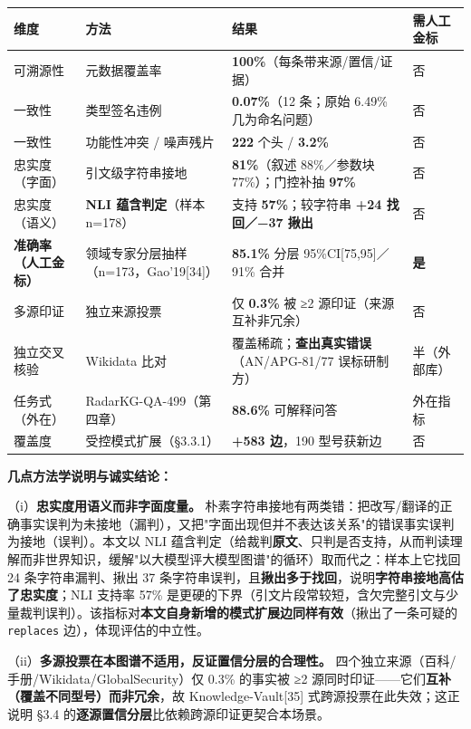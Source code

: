 \documentclass[12pt,a4paper]{ctexart}
\begin{document}
\begin{center}\small
\begin{tabular}{|p{}|p{}|p{}|p{}|}
\hline
\textbf{维度} & \textbf{方法} & \textbf{结果} & \textbf{需人工金标} \\ \hline
可溯源性 & 元数据覆盖率 & \textbf{100\%}（每条带来源/置信/证据） & 否 \\ \hline
一致性 & 类型签名违例 & \textbf{0.07\%}（12 条；原始 6.49\% 几为命名问题） & 否 \\ \hline
一致性 & 功能性冲突 / 噪声残片 & \textbf{222} 个头 / \textbf{3.2\%} & 否 \\ \hline
忠实度（字面） & 引文级字符串接地 & \textbf{81\%}（叙述 88\%／参数块 77\%）；门控补抽 \textbf{97\%} & 否 \\ \hline
忠实度（语义） & \textbf{NLI 蕴含判定}（样本 n=178） & 支持 \textbf{57\%}；较字符串 \textbf{+24 找回／−37 揪出} & 否 \\ \hline
\textbf{准确率（人工金标）} & 领域专家分层抽样（n=173，Gao'19[34]） & \textbf{85.1\%} 分层 95\%CI[75,95]／91\% 合并 & \textbf{是} \\ \hline
多源印证 & 独立来源投票 & 仅 \textbf{0.3\%} 被 ≥2 源印证（来源互补非冗余） & 否 \\ \hline
独立交叉核验 & Wikidata 比对 & 覆盖稀疏；\textbf{查出真实错误}（AN/APG-81/77 误标研制方） & 半（外部库） \\ \hline
任务式（外在） & RadarKG-QA-499（第四章） & \textbf{88.6\%} 可解释问答 & 外在指标 \\ \hline
覆盖度 & 受控模式扩展（§3.3.1） & \textbf{+583 边}，190 型号获新边 & 否 \\ \hline
\end{tabular}
\end{center}

\textbf{几点方法学说明与诚实结论：}

（i）\textbf{忠实度用语义而非字面度量。} 朴素字符串接地有两类错：把改写/翻译的正确事实误判为未接地（漏判），又把"字面出现但并不表达该关系"的错误事实误判为接地（误判）。本文以 NLI 蕴含判定（给裁判\textbf{原文}、只判是否支持，从而判读理解而非世界知识，缓解"以大模型评大模型图谱"的循环）取而代之：样本上它找回 24 条字符串漏判、揪出 37 条字符串误判，且\textbf{揪出多于找回}，说明\textbf{字符串接地高估了忠实度}；NLI 支持率 57\% 是更硬的下界（引文片段常较短，含欠完整引文与少量裁判误判）。该指标对\textbf{本文自身新增的模式扩展边同样有效}（揪出了一条可疑的 \texttt{replaces} 边），体现评估的中立性。

（ii）\textbf{多源投票在本图谱不适用，反证置信分层的合理性。} 四个独立来源（百科/手册/Wikidata/GlobalSecurity）仅 0.3\% 的事实被 ≥2 源同时印证——它们\textbf{互补（覆盖不同型号）而非冗余}，故 Knowledge-Vault[35] 式跨源投票在此失效；这正说明 §3.4 的\textbf{逐源置信分层}比依赖跨源印证更契合本场景。
\end{document}
